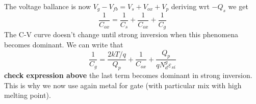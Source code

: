 The voltage ballance is now $V_g-V_{fb}=V_s+V_{ox}+V_p$ deriving wrt $-Q_s$ we get 
\begin{equation}
\frac{1}{C_{ox}}=\frac{1}{C_{s}}+\frac{1}{C_{ox}}+\frac{1}{C_{g}}
\end{equation}
The C-V curve doesn't change until strong inversion when this phenomena becomes dominant. We can write that 
\begin{equation}
\frac{1}{C_g}=\frac{2kT/q}{Q_p}+\frac{1}{C_{ox}}+\frac{Q_p}{qN_d^{g}\varepsilon_{si}}
\end{equation}
{\bf check expression above} the last term becomes dominant in strong inversion.\\
This is why we now use again metal for gate (with particular mix with high melting point).\\
































